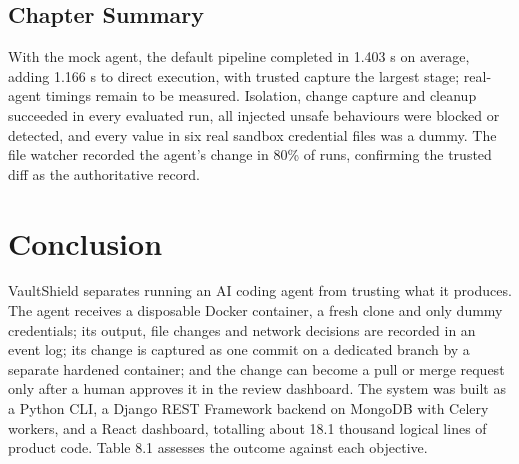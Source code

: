 \documentclass[12pt,a4paper,oneside]{report}
\begin{document}
\section{Chapter Summary}\label{chapter-summary}

With the mock agent, the default pipeline completed in 1.403 s on average, adding 1.166 s to direct execution, with trusted capture the largest stage; real-agent timings remain to be measured. Isolation, change capture and cleanup succeeded in every evaluated run, all injected unsafe behaviours were blocked or detected, and every value in six real sandbox credential files was a dummy. The file watcher recorded the agent's change in 80\% of runs, confirming the trusted diff as the authoritative record.

\clearpage

\chapter{Conclusion}\label{conclusion}

VaultShield separates running an AI coding agent from trusting what it produces. The agent receives a disposable Docker container, a fresh clone and only dummy credentials; its output, file changes and network decisions are recorded in an event log; its change is captured as one commit on a dedicated branch by a separate hardened container; and the change can become a pull or merge request only after a human approves it in the review dashboard. The system was built as a Python CLI, a Django REST Framework backend on MongoDB with Celery workers, and a React dashboard, totalling about 18.1 thousand logical lines of product code. Table 8.1 assesses the outcome against each objective.
\end{document}
